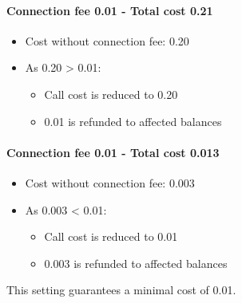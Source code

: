 \documentclass[letterpaper,10pt,spanish]{sphinxmanual}
\begin{document}
\paragraph{Connection fee 0.01 - Total cost 0.21}
\begin{itemize}
\item {} 
Cost without connection fee: 0.20

\item {} 
As 0.20 \textgreater{} 0.01:
\begin{itemize}
\item {} 
Call cost is reduced to 0.20

\item {} 
0.01 is refunded to affected balances

\end{itemize}

\end{itemize}
\paragraph{Connection fee 0.01 - Total cost 0.013}
\begin{itemize}
\item {} 
Cost without connection fee: 0.003

\item {} 
As 0.003 \textless{} 0.01:
\begin{itemize}
\item {} 
Call cost is reduced to 0.01

\item {} 
0.003 is refunded to affected balances

\end{itemize}

\end{itemize}

This setting guarantees a minimal cost of 0.01.
\end{document}
